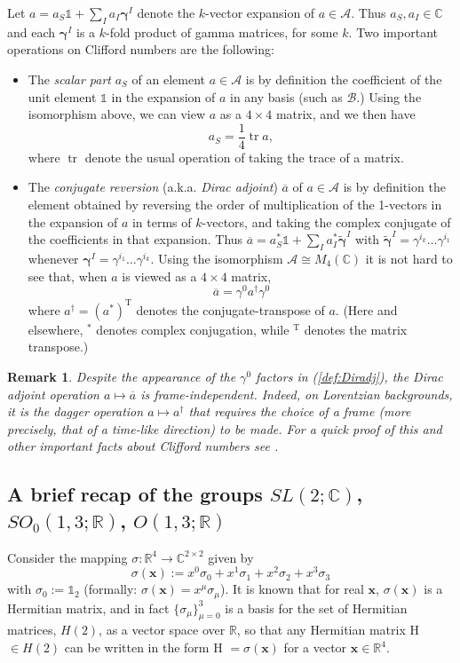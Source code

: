 \documentclass[12pt]{article}
\theoremstyle{definition}
\newtheorem{rem}[thm]{Remark}
\DeclareMathOperator{\tr}{tr}
\newcommand{\refeq}[1]{(\ref{#1})}
\numberwithin{equation}{section}
\newcommand{\bx}{\mathbf{x}}
\newcommand{\beq}{\begin{equation}}
\newcommand{\eeq}{\end{equation}}
\newcommand{\Id}{\mathds{1}}
\newcommand{\cA}{\mathcal{A}}
\newcommand{\cB}{\mathcal{B}}
\newcommand{\Cset}{{\mathbb C}}
\newcommand{\Rset}{{\mathbb R}}
\newcommand{\ga}{\gamma}
\newcommand{\bga}{\boldsymbol{\gamma}}
\newcommand{\si}{\sigma}
\begin{document}
 Let $a = a_S \Id +\sum_I a_I \bga^I$ denote the $k$-vector expansion of $a\in \cA$. 
 Thus $a_S,a_I\in \Cset$ and each $\bga^I$ is a $k$-fold product of gamma matrices, for some $k$. 
 Two important operations on Clifford numbers are the following:  
\begin{itemize}
\item 
The {\em scalar part} $a_S$ of an element $a \in \cA$ is by definition the coefficient of the unit element $\Id$ in the expansion of $a$ in 
any basis (such as $\cB$.)  
Using the isomorphism above, we can view $a$ as a $4\times 4$ matrix, and we then have
\beq 
a_S = \frac{1}{4}\tr a,
\eeq
where $\tr$ denote the usual operation of taking the trace of a matrix.
\item 
The {\em conjugate reversion} (a.k.a. {\em Dirac adjoint}) $\overline{a}$ of  $a\in\cA$ is by definition the element 
obtained by reversing the order of multiplication of the 1-vectors in the expansion of $a$ in terms of $k$-vectors, 
and taking the complex conjugate of the coefficients in that expansion. 
 Thus
$
\overline{a} = a_S^* \Id + \sum_I a_I^* \tilde{\bga}^I 
$
with $\tilde{\bga}^I = \ga^{i_k}\dots\ga^{i_1}$ whenever $\bga^I = \ga^{i_1}\dots\ga^{i_k}$. 
 Using the isomorphism $\cA \cong M_4(\Cset)$ it is not hard to see that, when $a$ is viewed as a $4\times 4$ matrix,
\beq\label{def:Diradj}
\overline{a} = \ga^0 a^\dag \ga^0
\eeq
where $a^\dag = (a^*)^{\mathrm{T}}$ denotes the conjugate-transpose of $a$. 
(Here and elsewhere, ${}^\ast$ denotes complex conjugation, while ${}^{\mathrm{T}}$ denotes the matrix transpose.)
\end{itemize}
\begin{rem}\label{rem:diradj}
\textit{Despite the appearance of the $\ga^0$ factors in \refeq{def:Diradj}, the Dirac adjoint operation $a\mapsto \overline{a}$ 
is frame-independent.
  Indeed, on Lorentzian backgrounds, it is the dagger operation $a \mapsto a^\dag$ that requires the choice of a frame (more precisely,
 that of a time-like direction) to be made. 
 For a quick proof of this and other important facts about Clifford numbers see \cite{Rie1946}.}
\end{rem}


\subsection{A brief recap of the groups $SL(2;\Cset)$, $SO_0(1,3;\Rset)$, $O(1,3;\Rset)$}
\label{sec:LorentzRep}
 Consider the mapping $\si :\Rset^4 \to \Cset^{2\times 2}$ given by
\beq \label{def:si}
\si(\bx) := x^0 \si_0 + x^1\si_1 + x^2\si_2 + x^3 \si_3 
\eeq
with $\si_0 := \mathds{1}_2$ (formally:
$\si(\bx) = x^\mu \si_\mu$).
  It is known that for real $\bx$, $\si(\bx)$ is a Hermitian matrix, and in fact $\{\si_\mu\}_{\mu=0}^3$ is a basis for the set of
Hermitian matrices, $H(2)$, as a vector space over $\Rset$, so that any Hermitian matrix H $\in H(2)$ can be written in the form
H $=\sigma(\bx)$ for a vector $\bx\in\Rset^4$.  
\end{document}
